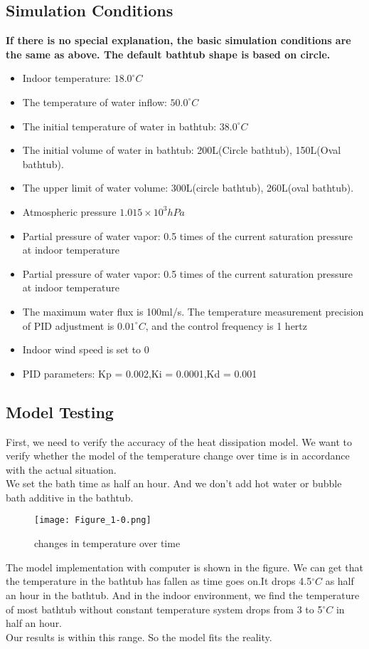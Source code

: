 \documentclass{mcmthesis}
\begin{document}
\subsection{Simulation Conditions}
\indent \textbf{If there is no special explanation, the basic simulation conditions are the same as above. The default bathtub shape is based on  circle.}
\begin{itemize}
	\item{Indoor temperature: $18.0^{\circ}C$ }
	\item{The temperature of water inflow: $50.0^{\circ}C$ }
	\item{The initial temperature of water in bathtub: $38.0^{\circ}C$ }
	\item{The initial volume of water in bathtub: 200L(Circle bathtub), 150L(Oval bathtub).}
	\item{The upper limit of water volume: 300L(circle bathtub), 260L(oval bathtub).}
	\item{Atmospheric pressure $1.015 \times 10^{3} hPa$}
	\item{Partial pressure of water vapor: 0.5 times of the current saturation pressure at indoor temperature}
	\item{Partial pressure of water vapor: 0.5 times of the current saturation pressure at indoor temperature}
	\item{The maximum water flux is 100ml/s. The temperature measurement precision of PID adjustment is $0.01^{\circ}C$, and the control frequency is 1 hertz}
	\item{Indoor wind speed is set to 0}
	\item{PID parameters: Kp = 0.002,Ki = 0.0001,Kd = 0.001}
\end{itemize}
\subsection{Model Testing}			%
\indent First, we need to verify the accuracy of the heat dissipation model.
We want to verify whether the model of the temperature change over time is in accordance with the actual situation.\\
\indent We set the bath time as half an hour. And we don't add hot water or bubble bath additive in the bathtub. \\
\begin{figure}[H]
\centerline{\texttt{[image: Figure\_1-0.png]}}
\caption{changes in temperature over time}
\label{oval}	
\end{figure}
\indent The model implementation with computer is shown in the figure.
We can get that the temperature in the bathtub has fallen as time goes on.It drops 4.5$^{\circ}C$ as half an hour in the bathtub. And in the indoor environment, we find the temperature of most bathtub without constant temperature system drops from 3 to 5$^{\circ}C$ in half an hour. \\ \indent Our results is within this range. So the model fits the reality.               
\end{document}
